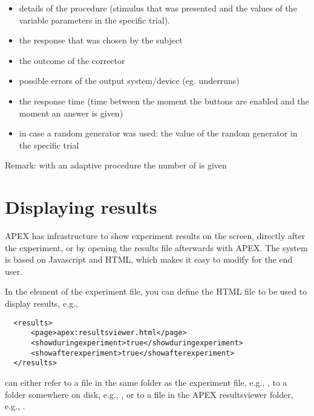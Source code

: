 \begin{itemize}
\item details of the procedure (stimulus that was presented and
the values of the variable parameters in the specific trial).

\item the response that was chosen by the subject

\item the outcome of the corrector

\item possible errors of the output system/device (eg. underruns)

\item the response time (time between the moment the buttons are
 enabled and the moment an answer is given)


\item in case a random generator was used: the value of the random
generator in the specific trial
\end{itemize}

Remark: with an adaptive procedure the number of
 is given


\section{Displaying results}

APEX has infrastructure to show experiment results on the screen, directly after the experiment, or by opening the results file afterwards with APEX. The system is based on Javascript and HTML, which makes it easy to modify for the end user.


In the  element of the experiment file, you can define the HTML file to be used to display results, e.g.,

\begin{lstlisting}
  <results>
      <page>apex:resultsviewer.html</page>
      <showduringexperiment>true</showduringexperiment>
      <showafterexperiment>true</showafterexperiment>
  </results>
\end{lstlisting}

 can either refer to a file in the same folder as the experiment file, e.g., , to a folder somewhere on disk, e.g., , or to a file in the APEX resultsviewer folder, e.g., .

